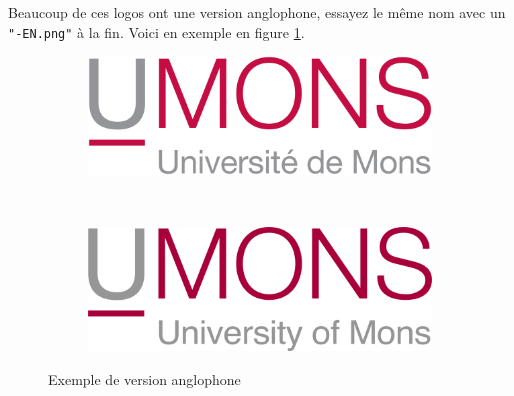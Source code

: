 \documentclass{umonsreport}
\begin{document}
Beaucoup de ces logos ont une version anglophone, essayez le même nom avec un \texttt{"-EN.png"} à la fin. Voici en exemple en figure \ref{en-logos}.
\begin{figure}[H]
    \centering
    \begin{subfigure}[t]{.4\textwidth}
        \centering
        \includegraphics[width=\textwidth]{logos/Umons.png}
    \end{subfigure}
    ~\hspace{3em}
    \begin{subfigure}[t]{.4\textwidth}
        \centering
        \includegraphics[width=\textwidth]{logos/Umons-EN.png}
    \end{subfigure}
    \caption{Exemple de version anglophone}
    \label{en-logos}
\end{figure}
\end{document}
